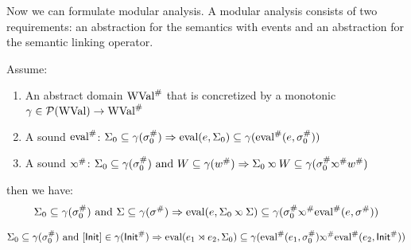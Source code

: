 Now we can formulate modular analysis.
A modular analysis consists of two requirements: an abstraction for the semantics with events and an abstraction for the semantic linking operator.
\begin{thm}
  Assume:
  \begin{enumerate}
    \item An abstract domain ${\text{WVal}}^{\#}$ that is concretized by a monotonic $\gamma\in\mathcal{P}(\text{WVal})\rightarrow{\text{WVal}}^{\#}$
    \item A sound ${\text{eval}}^{\#}$: $\Sigma_0\subseteq\gamma({\sigma}^{\#}_0)\Rightarrow\text{eval}(e,\Sigma_0)\subseteq\gamma({\text{eval}}^{\#}(e,{\sigma}^{\#}_0))$
    \item A sound $\Abs\semlink$: $\Sigma_0\subseteq\gamma(\Abs\ctx_0)\text{ and }W\subseteq\gamma(\Abs{w})\Rightarrow\Sigma_0\semlink W\subseteq\gamma(\Abs\ctx_0\Abs\semlink\Abs{w})$
  \end{enumerate}
  then we have:
  \[\Sigma_0\subseteq\gamma(\Abs\ctx_0)\text{ and }\Sigma\subseteq\gamma(\Abs\ctx)\Rightarrow\eval(e,\Sigma_0\semlink\Sigma)\subseteq\gamma(\Abs\ctx_0\Abs\semlink\Abs\eval(e,\Abs\ctx))\]
\end{thm}
\begin{cor}
  \[\Sigma_0\subseteq\gamma(\Abs\ctx_0)\text{ and }[\InitE]\in\gamma(\Abs\InitE)\Rightarrow\eval(e_1\synlink e_2,\Sigma_0)\subseteq\gamma(\Abs\eval(e_1,\Abs\ctx_0)\Abs\semlink\Abs\eval(e_2,\Abs\InitE))\]
\end{cor}
